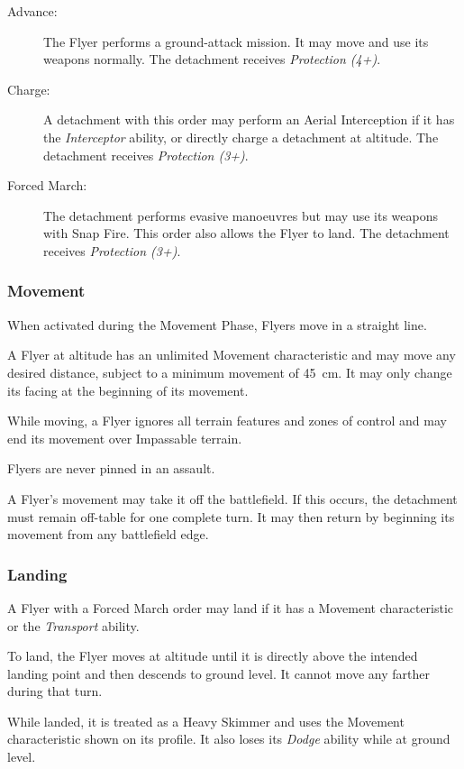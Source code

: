 \begin{description}
    \item[Advance:] The Flyer performs a ground-attack mission. It may move and use its weapons normally. The detachment receives \textit{Protection (4+)}.

    \item[Charge:] A detachment with this order may perform an Aerial Interception if it has the \textit{Interceptor} ability, or directly charge a detachment at altitude. The detachment receives \textit{Protection (3+)}.

    \item[Forced March:] The detachment performs evasive manoeuvres but may use its weapons with Snap Fire. This order also allows the Flyer to land. The detachment receives \textit{Protection (3+)}.
\end{description}

\subsubsection{Movement}

When activated during the Movement Phase, Flyers move in a straight line.

A Flyer at altitude has an unlimited Movement characteristic and may move any desired distance, subject to a minimum movement of 45~cm. It may only change its facing at the beginning of its movement.

While moving, a Flyer ignores all terrain features and zones of control and may end its movement over Impassable terrain.

Flyers are never pinned in an assault.

A Flyer's movement may take it off the battlefield. If this occurs, the detachment must remain off-table for one complete turn. It may then return by beginning its movement from any battlefield edge.

\subsubsection{Landing}

A Flyer with a Forced March order may land if it has a Movement characteristic or the \textit{Transport} ability.

To land, the Flyer moves at altitude until it is directly above the intended landing point and then descends to ground level. It cannot move any farther during that turn.

While landed, it is treated as a Heavy Skimmer and uses the Movement characteristic shown on its profile. It also loses its \textit{Dodge} ability while at ground level.

